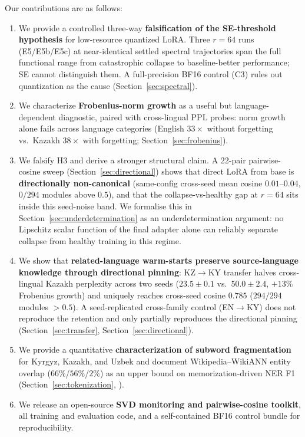 \documentclass[11pt]{article}
\begin{document}
Our contributions are as follows:
\begin{enumerate}
    \item We provide a controlled three-way \textbf{falsification of the SE-threshold hypothesis} for low-resource quantized LoRA. Three $r{=}64$ runs (E5/E5b/E5c) at near-identical settled spectral trajectories span the full functional range from catastrophic collapse to baseline-better performance; SE cannot distinguish them. A full-precision BF16 control (C3) rules out quantization as the cause (Section~\ref{sec:spectral}).
    \item We characterize \textbf{Frobenius-norm growth} as a useful but language-dependent diagnostic, paired with cross-lingual PPL probes: norm growth alone fails across language categories (English $33\times$ without forgetting vs.\ Kazakh $38\times$ with forgetting; Section~\ref{sec:frobenius}).
    \item We falsify H3 and derive a stronger structural claim. A 22-pair pairwise-cosine sweep (Section~\ref{sec:directional}) shows that direct LoRA from base is \textbf{directionally non-canonical} (same-config cross-seed mean cosine $0.01$--$0.04$, $0/294$ modules above $0.5$), and that the collapse-vs-healthy gap at $r{=}64$ sits inside this seed-noise band. We formalise this in Section~\ref{sec:underdetermination} as an underdetermination argument: no Lipschitz scalar function of the final adapter alone can reliably separate collapse from healthy training in this regime.
    \item We show that \textbf{related-language warm-starts preserve source-language knowledge through directional pinning}: KZ$\rightarrow$KY transfer halves cross-lingual Kazakh perplexity across two seeds ($23.5 \pm 0.1$ vs.\ $50.0 \pm 2.4$, $+13\%$ Frobenius growth) and uniquely reaches cross-seed cosine $0.785$ ($294/294$ modules $>0.5$). A seed-replicated cross-family control (EN$\rightarrow$KY) does not reproduce the retention and only partially reproduces the directional pinning (Section~\ref{sec:transfer}, Section~\ref{sec:directional}).
    \item We provide a quantitative \textbf{characterization of subword fragmentation} for Kyrgyz, Kazakh, and Uzbek and document Wikipedia--WikiANN entity overlap ($66\%$/$56\%$/$2\%$) as an upper bound on memorization-driven NER F1 (Section~\ref{sec:tokenization}, ).
    \item We release an open-source \textbf{SVD monitoring and pairwise-cosine toolkit}, all training and evaluation code, and a self-contained BF16 control bundle for reproducibility.
\end{enumerate}
\end{document}
